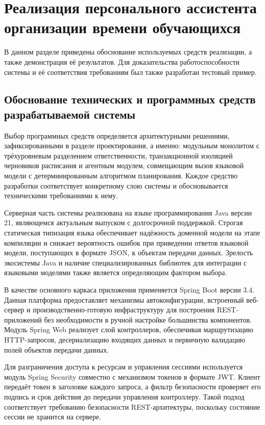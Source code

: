 \section{Реализация персонального ассистента организации времени обучающихся} 
\label{sec:development}

В данном разделе приведены обоснование используемых средств реализации, а также демонстрация её результатов. Для доказательства работоспособности системы и её соответствия требованиям был также разработан тестовый пример.

\subsection{Обоснование технических и программных средств разрабатываемой системы}

Выбор программных средств определяется архитектурными решениями, зафиксированными в разделе проектирования, а именно: модульным монолитом с трёхуровневым разделением ответственности, транзакционной изоляцией черновиков расписания и агентным модулем, совмещающим вызов языковой модели с детерминированным алгоритмом планирования. Каждое средство разработки соответствует конкретному слою системы и обосновывается техническими требованиями к нему.

\numberedparagraph
Серверная часть системы реализована на языке программирования Java версии 21, являющемся актуальным выпуском с долгосрочной поддержкой. Строгая статическая типизация языка обеспечивает надёжность доменной модели на этапе компиляции и снижает вероятность ошибок при приведении ответов языковой модели, поступающих в формате JSON, к объектам передачи данных. Зрелость экосистемы Java и наличие специализированных библиотек для интеграции с языковыми моделями также является определяющим фактором выбора.

В качестве основного каркаса приложения применяется Spring Boot версии 3.4. Данная платформа предоставляет механизмы автоконфигурации, встроенный веб-сервер и производственно-готовую инфраструктуру для построения REST-приложений без необходимости в ручной настройке большинства компонентов. Модуль Spring Web реализует слой контроллеров, обеспечивая маршрутизацию HTTP-запросов, десериализацию входящих данных и первичную валидацию полей объектов передачи данных.

Для разграничения доступа к ресурсам и управления сессиями используется модуль Spring Security совместно с механизмом токенов в формате JWT. Клиент передаёт токен в заголовке каждого запроса, а фильтр безопасности проверяет его подпись и срок действия до передачи управления контроллеру. Такой подход соответствует требованию безопасности REST-архитектуры, поскольку состояние сессии не хранится на сервере.

